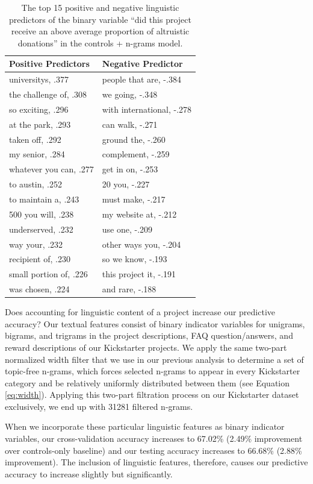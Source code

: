 \documentclass[letterpaper]{article}
\begin{document}
\begin{table}[t]
\centering
\begin{tabular}{|l|l|}
\hline
Positive Predictors & Negative Predictor \\
\hline
universitys, .377 & people that are, -.384 \\
the challenge of, .308 & we going, -.348\\
so exciting, .296 & with international, -.278\\
at the park, .293 & can walk, -.271\\
taken off, .292 & ground the, -.260\\
my senior, .284 & complement, -.259\\
whatever you can, .277 & get in on, -.253\\
to austin, .252 & 20 you, -.227\\
to maintain a, .243 & must make, -.217\\
500 you will, .238 & my website at, -.212\\
underserved, .232 & use one, -.209 \\
way your, .232 & other ways you, -.204\\
recipient of, .230 & so we know, -.193\\
small portion of, .226 & this project it, -.191\\
was chosen, .224 & and rare, -.188\\
\hline
\end{tabular}
\caption{The top 15 positive and negative linguistic predictors of the binary variable ``did this project receive an above average proportion of altruistic donations'' in the controls + n-grams model.}
\label{tab:regression}
\end{table}

Does accounting for linguistic content of a project increase our predictive accuracy? Our textual features consist of binary indicator variables for unigrams, bigrams, and trigrams in the project descriptions, FAQ question/answers, and reward descriptions of our Kickstarter projects. We apply the same two-part normalized width filter that we use in our previous analysis to determine a set of topic-free n-grams, which forces selected n-grams to appear in every Kickstarter category and be relatively uniformly distributed between them (see Equation \ref{eq:width}). Applying this two-part filtration process on our Kickstarter dataset exclusively, we end up with 31281 filtered n-grams.

When we incorporate these particular linguistic features as binary indicator variables, our cross-validation accuracy increases to 67.02\% (2.49\% improvement over controls-only baseline) and our testing accuracy increases to 66.68\% (2.88\% improvement). The inclusion of linguistic features, therefore, causes our predictive accuracy to increase slightly but significantly.
\end{document}
